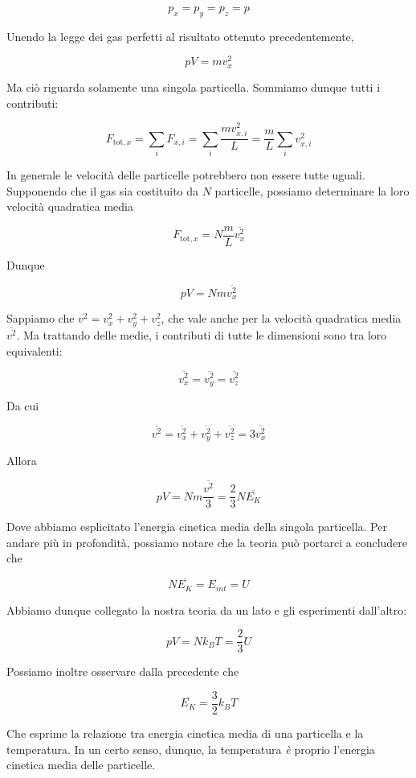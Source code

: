 \[ p_x = p_y = p_z = p \]

Unendo la legge dei gas perfetti al risultato ottenuto precedentemente,

\[ pV = mv_x^2 \]

Ma ciò riguarda solamente una singola particella. Sommiamo dunque
tutti i contributi:

\[ F_{\text{tot}, x} = \sum_i F_{x,i} = \sum_i \frac{mv_{x,i}^2}{L} = \frac{m}{L}\sum_iv_{x,i}^2 \]

In generale le velocità delle particelle potrebbero non essere tutte
uguali. Supponendo che il gas sia costituito da $N$ particelle, possiamo
determinare la loro velocità quadratica media

\[ F_{\text{tot},x} = N\frac{m}{L}\overline{v_x^2} \]

Dunque

\[ pV = Nm\overline{v_x^2} \]

Sappiamo che $v^2 = v_x^2 + v_y^2 + v_z^2$, che vale anche per la
velocità quadratica media $\overline{v^2}$. Ma trattando delle medie,
i contributi di tutte le dimensioni sono tra loro equivalenti:

\[ \overline{v_x^2} = \overline{v_y^2} = \overline{v_z^2} \]

Da cui

\[ \overline{v^2} = \overline{v_x^2} + \overline{v_y^2} + \overline{v_z^2} = 3\overline{v_x^2} \]

Allora

\[ pV = Nm\frac{\overline{v^2}}{3} = \frac{2}{3}N\overline{E_K}\]

Dove abbiamo esplicitato l'energia cinetica media della singola particella.
Per andare più in profondità, possiamo notare che la teoria può
portarci a concludere che

\[ N\overline{E_K} = E_{int} = U \]

Abbiamo dunque collegato la nostra teoria da un lato e gli esperimenti
dall'altro:

\[ pV = Nk_BT = \frac{2}{3}U \]

Possiamo inoltre osservare dalla precedente che

\[ \overline{E_K} = \frac{3}{2}k_BT \]

Che esprime la relazione tra energia cinetica media di una particella
e la temperatura. In un certo senso, dunque, la temperatura \textit{è}
proprio l'energia cinetica media delle particelle.

